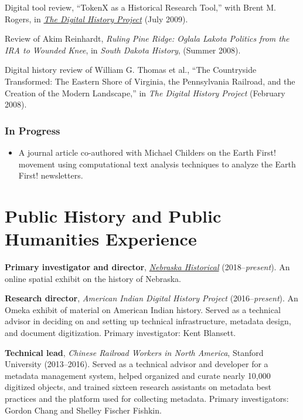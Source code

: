 Digital tool review, ``TokenX as a Historical Research Tool,'' with
Brent M. Rogers, in
\emph{\href{http://digitalhistory.unl.edu/t-reviews/tokenxhepplerrogers.php}{The
Digital History Project}} (July 2009).

Review of Akim Reinhardt, \emph{Ruling Pine Ridge: Oglala Lakota
Politics from the IRA to Wounded Knee}, in \emph{South Dakota History},
(Summer 2008).

Digital history review of William G. Thomas et al., ``The Countryside
Transformed: The Eastern Shore of Virginia, the Pennsylvania Railroad,
and the Creation of the Modern Landscape,'' in \emph{The Digital History
Project} (February 2008).

\subsubsection{In Progress}\label{in-progress}

\begin{itemize}
\tightlist
\item
  A journal article co-authored with Michael Childers on the Earth
  First! movement using computational text analysis techniques to
  analyze the Earth First! newsletters.
\end{itemize}

\section{Public History and Public Humanities
Experience}\label{public-history-and-public-humanities-experience}

\textbf{Primary investigator and director},
\emph{\href{http://svhistorical.org}{Nebraska Historical}}
(2018--\emph{present}). An online spatial exhibit on the history of
Nebraska.

\textbf{Research director}, \emph{American Indian Digital History
Project} (2016--\emph{present}). An Omeka exhibit of material on
American Indian history. Served as a technical advisor in deciding on
and setting up technical infrastructure, metadata design, and document
digitization. Primary investigator: Kent Blansett.

\textbf{Technical lead}, \emph{Chinese Railroad Workers in North
America}, Stanford University (2013--2016). Served as a technical
advisor and developer for a metadata management system, helped organized
and curate nearly 10,000 digitized objects, and trained sixteen research
assistants on metadata best practices and the platform used for
collecting metadata. Primary investigators: Gordon Chang and Shelley
Fischer Fishkin.

